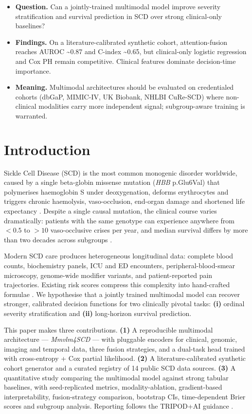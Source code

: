 \documentclass[11pt,a4paper]{article}
\begin{document}
\begin{keypoints}
\begin{itemize}[leftmargin=1.2em,itemsep=2pt,topsep=2pt]
\item \textbf{Question.} Can a jointly-trained multimodal model improve severity stratification and survival prediction in SCD over strong clinical-only baselines?
\item \textbf{Findings.} On a literature-calibrated synthetic cohort, attention-fusion reaches AUROC \textasciitilde 0.87 and C-index \textasciitilde 0.65, but clinical-only logistic regression and Cox PH remain competitive. Clinical features dominate decision-time importance.
\item \textbf{Meaning.} Multimodal architectures should be evaluated on credentialed cohorts (dbGaP, MIMIC-IV, UK Biobank, NHLBI CuRe-SCD) where non-clinical modalities carry more independent signal; subgroup-aware training is warranted.
\end{itemize}
\end{keypoints}
\FloatBarrier

\section{Introduction}
Sickle Cell Disease (SCD) is the most common monogenic disorder worldwide, caused by a single beta-globin missense mutation (\textit{HBB} p.Glu6Val) that polymerises haemoglobin S under deoxygenation, deforms erythrocytes and triggers chronic haemolysis, vaso-occlusion, end-organ damage and shortened life expectancy \cite{Piel2017,GBD2021SCD}. Despite a single causal mutation, the clinical course varies dramatically: patients with the same genotype can experience anywhere from $<\!0.5$ to $>\!10$ vaso-occlusive crises per year, and median survival differs by more than two decades across subgroups \cite{Piel2017}.

Modern SCD care produces heterogeneous longitudinal data: complete blood counts, biochemistry panels, ICU and ED encounters, peripheral-blood-smear microscopy, genome-wide modifier variants, and patient-reported pain trajectories. Existing risk scores compress this complexity into hand-crafted formulae \cite{Sebastiani2010,Quinn2007}. We hypothesise that a jointly trained multimodal model can recover stronger, calibrated decision functions for two clinically pivotal tasks: \textbf{(i)} ordinal severity stratification and \textbf{(ii)} long-horizon survival prediction.

This paper makes three contributions. \textbf{(1)} A reproducible multimodal architecture --- \textit{Mmvlm4SCD} --- with pluggable encoders for clinical, genomic, imaging and temporal data, three fusion strategies, and a dual-task head trained with cross-entropy + Cox partial likelihood. \textbf{(2)} A literature-calibrated synthetic cohort generator and a curated registry of 14 public SCD data sources. \textbf{(3)} A quantitative study comparing the multimodal model against strong tabular baselines, with seed-replicated metrics, modality-ablation, gradient-based interpretability, fusion-strategy comparison, bootstrap CIs, time-dependent Brier scores and subgroup analysis. Reporting follows the TRIPOD+AI guidance \cite{Collins2024TRIPODAI}.
\end{document}
